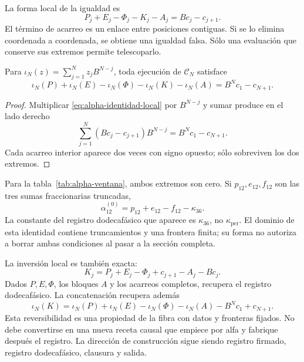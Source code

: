 La forma local de la igualdad es
\begin{equation}
 P_j+E_j-\Phi_j-K_j-A_j=Bc_j-c_{j+1}.
 \label{eq:alpha-identidad-local}
\end{equation}
El término de acarreo es un enlace entre posiciones contiguas. Si se lo
elimina coordenada a coordenada, se obtiene una igualdad falsa. Sólo una
evaluación que conserve sus extremos permite telescoparlo.

\begin{proposition}
\label{prop:alpha-telescopia}
Para \(\iota_N(z)=\sum_{j=1}^{N}z_jB^{N-j}\), toda ejecución de
\(\mathcal C_N\) satisface
\begin{equation}
 \iota_N(P)+\iota_N(E)-\iota_N(\Phi)-\iota_N(K)-\iota_N(A)
 =B^Nc_1-c_{N+1}.
 \label{eq:alpha-telescopia}
\end{equation}
\end{proposition}

\begin{proof}
Multiplicar \eqref{eq:alpha-identidad-local} por \(B^{N-j}\) y sumar
produce en el lado derecho
\[
 \sum_{j=1}^{N}(Bc_j-c_{j+1})B^{N-j}=B^Nc_1-c_{N+1}.
\]
Cada acarreo interior aparece dos veces con signo opuesto; sólo sobreviven
los dos extremos.
\end{proof}

Para la tabla~\ref{tab:alpha-ventana}, ambos extremos son cero. Si
\(p_{12},e_{12},f_{12}\) son las tres sumas fraccionarias truncadas,
\[
 \alpha_{12}^{(0)}=p_{12}+e_{12}-f_{12}-\kappa_{36}.
\]
La constante del registro dodecafásico que aparece es \(\kappa_{36}\), no
\(\kappa_{\mathrm{per}}\). El dominio de esta identidad contiene
truncamientos y una frontera finita; su forma no autoriza a borrar ambas
condiciones al pasar a la sección completa.

La inversión local es también exacta:
\[
 K_j=P_j+E_j-\Phi_j+c_{j+1}-A_j-Bc_j.
\]
Dados \(P,E,\Phi\), los bloques \(A\) y los acarreos completos,
recupera el registro dodecafásico. La concatenación recupera además
\[
 \iota_N(K)=\iota_N(P)+\iota_N(E)-\iota_N(\Phi)-\iota_N(A)
             -B^Nc_1+c_{N+1}.
\]
Esta reversibilidad es una propiedad de la fibra con datos y fronteras
fijados. No debe convertirse en una nueva receta causal que empiece por
alfa y fabrique después el registro. La dirección de construcción sigue
siendo registro firmado, registro dodecafásico, clausura y salida.



